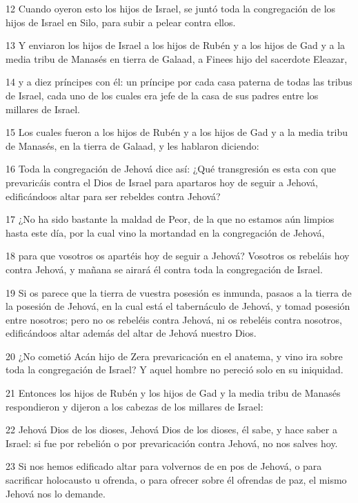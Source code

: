 \par 12 Cuando oyeron esto los hijos de Israel, se juntó toda la congregación de los hijos de Israel en Silo, para subir a pelear contra ellos.
\par 13 Y enviaron los hijos de Israel a los hijos de Rubén y a los hijos de Gad y a la media tribu de Manasés en tierra de Galaad, a Finees hijo del sacerdote Eleazar,
\par 14 y a diez príncipes con él: un príncipe por cada casa paterna de todas las tribus de Israel, cada uno de los cuales era jefe de la casa de sus padres entre los millares de Israel.
\par 15 Los cuales fueron a los hijos de Rubén y a los hijos de Gad y a la media tribu de Manasés, en la tierra de Galaad, y les hablaron diciendo:
\par 16 Toda la congregación de Jehová dice así: ¿Qué transgresión es esta con que prevaricáis contra el Dios de Israel para apartaros hoy de seguir a Jehová, edificándoos altar para ser rebeldes contra Jehová? 
\par 17 ¿No ha sido bastante la maldad de Peor, de la que no estamos aún limpios hasta este día, por la cual vino la mortandad en la congregación de Jehová, 
\par 18 para que vosotros os apartéis hoy de seguir a Jehová? Vosotros os rebeláis hoy contra Jehová, y mañana se airará él contra toda la congregación de Israel.
\par 19 Si os parece que la tierra de vuestra posesión es inmunda, pasaos a la tierra de la posesión de Jehová, en la cual está el tabernáculo de Jehová, y tomad posesión entre nosotros; pero no os rebeléis contra Jehová, ni os rebeléis contra nosotros, edificándoos altar además del altar de Jehová nuestro Dios.
\par 20 ¿No cometió Acán hijo de Zera prevaricación en el anatema, y vino ira sobre toda la congregación de Israel? Y aquel hombre no pereció solo en su iniquidad. 
\par 21 Entonces los hijos de Rubén y los hijos de Gad y la media tribu de Manasés respondieron y dijeron a los cabezas de los millares de Israel:
\par 22 Jehová Dios de los dioses, Jehová Dios de los dioses, él sabe, y hace saber a Israel: si fue por rebelión o por prevaricación contra Jehová, no nos salves hoy.
\par 23 Si nos hemos edificado altar para volvernos de en pos de Jehová, o para sacrificar holocausto u ofrenda, o para ofrecer sobre él ofrendas de paz, el mismo Jehová nos lo demande.
